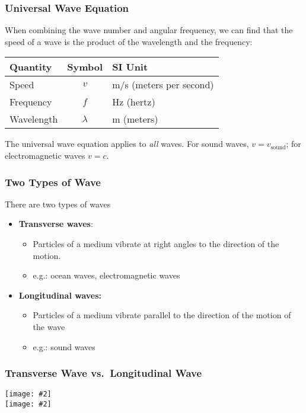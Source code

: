 \documentclass[12pt,aspectratio=169]{beamer}
\newcommand{\pic}[2]{\texttt{[image: \#2]}}
\newcommand{\eq}[2]{\vspace{#1}{\Large\begin{displaymath}#2\end{displaymath}}}
\begin{document}
\begin{frame}
  \frametitle{Universal Wave Equation}
  When combining the wave number and angular frequency, we can find that
  the speed of a wave is the product of the wavelength and the frequency:

  \eq{-.2in}{
    \boxed{v = f\lambda}
  }
  \begin{center}
    \begin{tabular}{l|c|l}
      \rowcolor{pink}
      \textbf{Quantity} & \textbf{Symbol} & \textbf{SI Unit} \\ \hline
      Speed         & $v$       & \si{m/s} (meters per second) \\
      Frequency     & $f$       & \si{\hertz} (hertz)\\
      Wavelength    & $\lambda$ & \si{\metre} (meters) \\
    \end{tabular}
  \end{center}
  The universal wave equation applies to \emph{all} waves. For sound waves,
  $v=v_\mathrm{sound}$; for electromagnetic waves $v=c$.
\end{frame}



\begin{frame}
  \frametitle{Two Types of  Wave}
  There are two types of waves
  \begin{itemize}
  \item\textbf{Transverse waves}:
    \begin{itemize}
    \item Particles of a medium vibrate at right angles to the direction of the
      motion.
    \item e.g.: ocean waves, electromagnetic waves
    \end{itemize}
  \item\textbf{Longitudinal waves:}
    \begin{itemize}
    \item Particles of a medium vibrate parallel to the direction of the motion
      of the wave
    \item e.g.: sound waves
    \end{itemize}
  \end{itemize}
\end{frame}



\begin{frame}
  \frametitle{Transverse Wave vs.\ Longitudinal Wave}
  \begin{center}
    \pic{.6}{transverse-wave.png}\\
    \pic{.6}{compression-wave.png}
  \end{center}
\end{frame}
\end{document}
